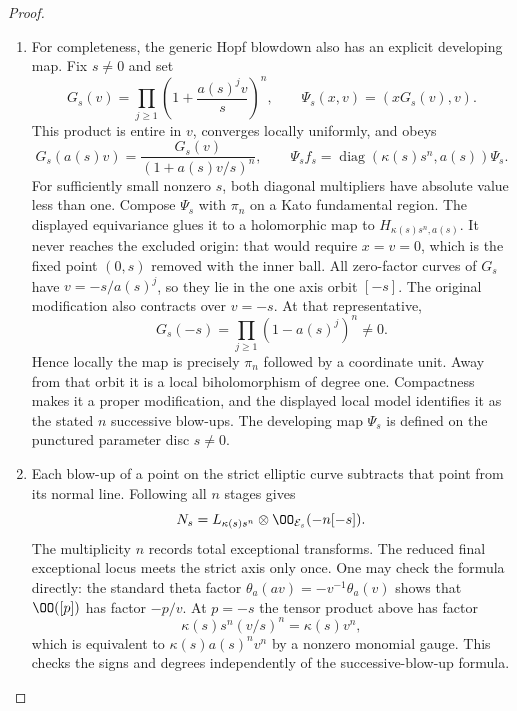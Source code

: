 \begin{proof}
\begin{enumerate}[label=\arabic*.,leftmargin=*]
\item For completeness, the generic Hopf blowdown also has an explicit
developing map. Fix $s\ne0$ and set
\[
 G_s(v)=\prod_{j\ge1}\left(1+\frac{a(s)^j v}{s}\right)^n,
       \qquad
 \Psi_s(x,v)=(xG_s(v),v).
\]
This product is entire in $v$, converges locally uniformly, and obeys
\[
 G_s(a(s)v)=\frac{G_s(v)}{(1+a(s)v/s)^n},\qquad
 \Psi_s f_s=\operatorname{diag}(\kappa(s)s^n,a(s))\Psi_s.
\]
For sufficiently small nonzero $s$, both diagonal multipliers have
absolute value less than one. Compose $\Psi_s$ with $\pi_n$ on a
Kato fundamental region. The displayed equivariance glues it to a
holomorphic map to $H_{\kappa(s)s^n,a(s)}$.
It never reaches the excluded origin: that would require
$x=v=0$, which is the fixed point $(0,s)$ removed with the inner ball.
All zero-factor curves of $G_s$ have
$v=-s/a(s)^j$, so they lie in the one axis orbit $[-s]$.
The original modification also contracts over $v=-s$.
At that representative,
\[
 G_s(-s)=\prod_{j\ge1}(1-a(s)^j)^n\ne0.
\]
Hence locally the map is precisely $\pi_n$ followed by a coordinate
unit. Away from that orbit it is a local biholomorphism of degree
one. Compactness makes it a proper modification, and the displayed
local model identifies it as the stated $n$ successive blow-ups.
The developing map $\Psi_s$ is defined on the punctured parameter disc $s\ne0$.

\item Each blow-up of a point on the strict elliptic curve subtracts that
point from its normal line. Following all $n$ stages gives
\[
 N_s=L_{\kappa(s)s^n}\otimes\OO_{\mathcal E_s}(-n[-s]).
\]
The multiplicity $n$ records total exceptional transforms.
The reduced final exceptional locus meets the strict axis only once.
One may check the formula directly: the standard theta factor
$\theta_a(av)=-v^{-1}\theta_a(v)$ shows that $\OO([p])$
has factor $-p/v$. At $p=-s$ the tensor product above has factor
\[
 \kappa(s)s^n(v/s)^n=\kappa(s)v^n,
\]
which is equivalent to $\kappa(s)a(s)^n v^n$ by a nonzero monomial
gauge. This checks the signs and degrees independently of the
successive-blow-up formula.


\end{enumerate}
\end{proof}
